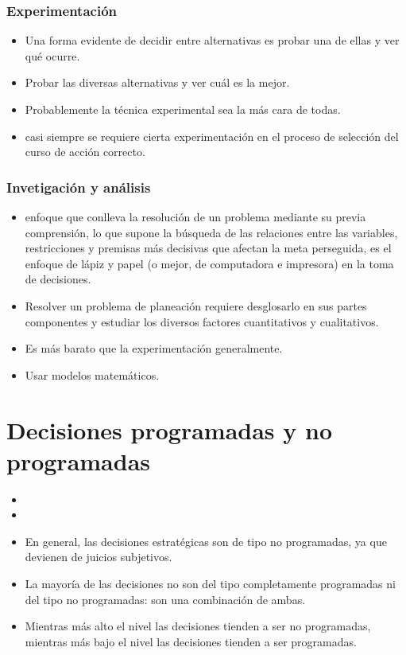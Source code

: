 \documentclass{article}
\begin{document}
\subsubsection{Experimentación}
\begin{itemize}
    \item Una forma evidente de decidir entre alternativas es probar una de ellas y ver qué ocurre.
    \item Probar las diversas alternativas y ver cuál es la mejor.
    \item  Probablemente la técnica experimental sea la más cara de todas.
    \item casi siempre se requiere cierta experimentación en el proceso de selección del curso de acción correcto.
\end{itemize}

\subsubsection{Invetigación y análisis}
\begin{itemize}
    \item enfoque que conlleva la resolución de un problema mediante su previa comprensión, lo que supone la búsqueda de las relaciones entre las variables, restricciones y premisas más decisivas que afectan la meta perseguida, es el enfoque de lápiz y papel (o mejor, de computadora e impresora) en la toma de decisiones. 
    \item Resolver un problema de planeación requiere desglosarlo en sus partes componentes y estudiar los diversos factores cuantitativos y cualitativos.
    \item Es más barato que la experimentación generalmente. 
    \item Usar modelos matemáticos.
\end{itemize}


\section{Decisiones programadas y no programadas}
\begin{itemize}
    \item {} 
    \item {} 
    \item En general, las decisiones estratégicas son de  tipo no programadas, ya que devienen de juicios subjetivos. 
    \item La mayoría de las decisiones no son del tipo completamente programadas ni del tipo no programadas: son una combinación de ambas.
    \item Mientras más alto el nivel las decisiones tienden a ser no programadas, mientras más bajo el nivel las decisiones tienden a ser programadas. 
\end{itemize}
\end{document}
